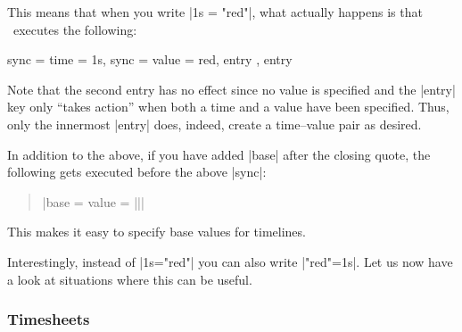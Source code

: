 This means that when you write |1s = "red"|, what actually happens is that
\tikzname\ executes the following:
%
\begin{codeexample}
sync = { time = 1s, sync = { value = red, entry }, entry }
\end{codeexample}
%
Note that the second entry has no effect since no value is specified and the
|entry| key only ``takes action'' when both a time and a value have been
specified. Thus, only the innermost |entry| does, indeed, create a time--value
pair as desired.

In addition to the above, if you have added |base| after the closing quote, the
following gets executed before the above |sync|:
%
\begin{quote}
    \normalfont
    |base = {value = ||}|
\end{quote}

This makes it easy to specify base values for timelines.

Interestingly, instead of |1s="red"| you can also write |"red"=1s|. Let us now
have a look at situations where this can be useful.


\subsubsection{Timesheets}

